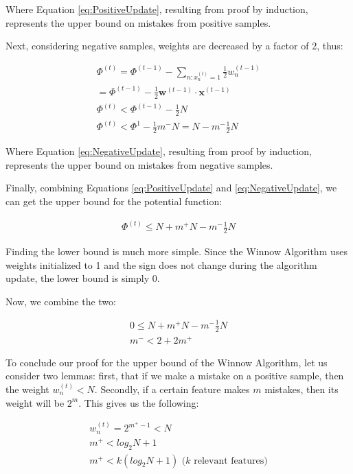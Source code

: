 \documentclass[11pt]{article}
\begin{document}
Where Equation \ref{eq:PositiveUpdate}, resulting from proof by induction, represents the upper bound on mistakes from positive samples. 

Next, considering negative samples, weights are decreased by a factor of 2, thus:

\begin{align}
    \Phi^{(t)} = \Phi^{(t-1)} - \sum_{n:x_n^{(t)}=1} \frac{1}{2}w_n^{(t-1)} \nonumber\\
    = \Phi^{(t-1)} - \frac{1}{2} \textbf{w}^{(t-1)}\cdot \textbf{x}^{(t-1)} \\
    \Phi^{(t)} < \Phi^{(t-1)} -\frac{1}{2}N \\
    \Phi^{(t)} < \Phi^{1} -\frac{1}{2}m^-N = N - m^-\frac{1}{2}N \label{eq:NegativeUpdate}
\end{align}

Where Equation \ref{eq:NegativeUpdate}, resulting from proof by induction, represents the upper bound on mistakes from negative samples.

Finally, combining Equations \ref{eq:PositiveUpdate} and \ref{eq:NegativeUpdate}, we can get the upper bound for the potential function:

\begin{align}
    \Phi^{(t)} \leq N +m^+N - m^-\frac{1}{2}N \label{eq:WinnowPotentialUpper}
\end{align}

Finding the lower bound is much more simple. Since the Winnow Algorithm uses weights initialized to 1 and the sign does not change during the algorithm update, the lower bound is simply 0.

Now, we combine the two:

\begin{align}
    0 \leq N + m^+ N - m^- \frac{1}{2} N \\
    m^- < 2 + 2m^+ \label{eq:37}
\end{align}

To conclude our proof for the upper bound of the Winnow Algorithm, let us consider two lemmas: first, that if we make a mistake on a positive sample, then the weight $w_n^{(t)} < N$. Secondly, if a certain feature makes $m$ mistakes, then its weight will be $2^m$. This gives us the following:

\begin{align}
    w_n^{(t)} = 2^{m^+-1} < N \\
    m^+ < log_2N + 1 \\
    m^+ < k(log_2N + 1) \, \, (\text{$k$ relevant features)}
\end{align}
\end{document}
